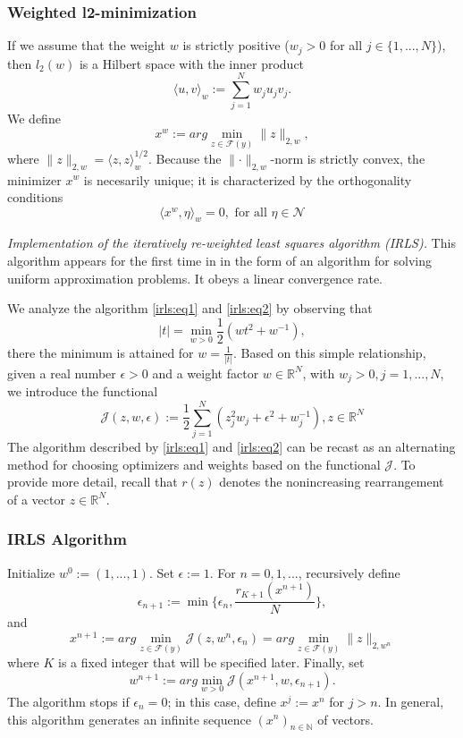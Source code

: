 \documentclass[
  english,        %
  font=times,     %
  onecolumn,      %
]{tumarticle}
\numberwithin{equation}{section} %
\begin{document}
\begin{large}
\begin{adjustwidth}{0pt}{0pt}
\subsubsection{Weighted l2-minimization}
If we assume that the weight $w$ is strictly positive ($w_j > 0$ for all $j \in \{1,...,N\}$), then $l_2(w)$ is a Hilbert space with the inner product
\[ \langle u,v \rangle_w := \sum_{j=1}^N w_j u_j v_j .\]
We define
\[ x^w := arg \min_{z \in \mathcal{F}(y)} \lVert z \rVert_{2,w} ,\]
where $\lVert z \rVert_{2,w} = \langle z,z \rangle_w^{1/2}$. Because the $\lVert \cdot \rVert_{2,w}$-norm is strictly convex, the minimizer $x^w$ is necesarily unique; it is characterized by the orthogonality conditions
\[ \langle x^w, \eta \rangle_w = 0, \text{ for all } \eta \in \mathcal{N}\]

\textit{Implementation of the iteratively re-weighted least squares algorithm (IRLS).}
This algorithm appears for the first time in \cite{Theo-of-LLMA} in the form of an algorithm for solving uniform approximation problems. It obeys a linear convergence rate.

We analyze the algorithm \ref{irls:eq1} and \ref{irls:eq2} by observing that
\[ |t| = \min_{w > 0} \frac{1}{2} (w t^2 + w^{-1}) ,\]
there the minimum is attained for $w = \frac{1}{|t|}$. Based on this simple relationship, given a real number $\epsilon > 0$ and a weight factor $w \in \mathbb{R}^N$, with $w_j > 0, j = 1,...,N$, we introduce the functional
\[ \mathcal{J}(z,w,\epsilon) := \frac{1}{2} \sum_{j=1}^N (z_j^2 w_j + \epsilon^2 + w_j^{-1}), z \in \mathbb{R}^N \]
The algorithm described by \ref{irls:eq1} and \ref{irls:eq2} can be recast as an alternating method for choosing optimizers and weights based on the functional $\mathcal{J}$. To provide more detail, recall that $r(z)$ denotes the nonincreasing rearrangement of a vector $z \in \mathbb{R}^N$.

\subsubsection{IRLS Algorithm}
Initialize $w^0 := (1,...,1)$. Set $\epsilon := 1$. For $n = 0,1,...$, recursively define
\begin{equation}
    \epsilon_{n+1} := \min \{ \epsilon_n , \frac{r_{K+1} (x^{n+1})}{N} \},
\end{equation}
and
\begin{equation}
    x^{n+1} := arg \min_{z \in \mathcal{F}(y)} \mathcal{J}(z,w^n,\epsilon_n) = arg \min_{z \in \mathcal{F}(y)} \lVert z \rVert_{2,w^n}
\end{equation}
where $K$ is a fixed integer that will be specified later. Finally, set
\begin{equation}
    w^{n+1} := arg \min_{w>0} \mathcal{J}(x^{n+1},w,\epsilon_{n+1}).
\end{equation}
The algorithm stops if $\epsilon_n = 0$; in this case, define $x^j := x^n$ for $j > n$. In general, this algorithm generates an infinite sequence $(x^n)_{n \in \mathbb{N}}$ of vectors.


\end{adjustwidth}
\end{large}
\end{document}
